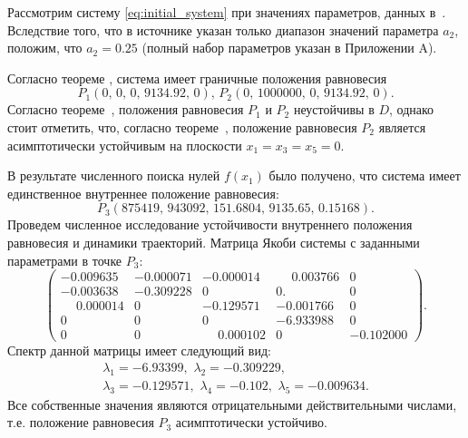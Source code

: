 \documentclass[14pt,a4paper]{extarticle}
\begin{document}
	\begin{example}
		Рассмотрим систему \ref{eq:initial_system} при значениях параметров, данных в~\cite{model_params}. Вследствие того, что в источнике указан только диапазон значений параметра $a_2$, положим, что $a_2=0.25$ (полный набор параметров указан в Приложении A). 
		
		Согласно теореме , система имеет граничные положения равновесия
		\[P_1\left(0,\,0,\,0,\,9134.92,\,0\right),\, P_2\left(0,\,1000000,\,0,\,9134.92,\,0\right).\]
		Согласно теореме~, положения равновесия $P_1$ и $P_2$ неустойчивы в $D$, однако стоит отметить, что, согласно теореме~, положение равновесия $P_2$ является асимптотически устойчивым на плоскости $x_1=x_3=x_5=0$. 
		
		В результате численного поиска нулей $f(x_1)$ было получено, что система имеет единственное внутреннее положение равновесия:
		\[P_3\left(875419,\,943092,\,151.6804,\,9135.65,\,0.15168\right).\]
		Проведем численное исследование устойчивости внутреннего положения равновесия и динамики траекторий. Матрица Якоби системы с заданными параметрами в точке $P_3$: 
		\[\begin{pmatrix}
			-0.009635&-0.000071&-0.000014& \phantom{-}0.003766&0\\
			-0.003638&-0.309228& 0       & 0.      & 0\\
			\phantom{-}0.000014& 0   &    -0.129571&-0.001766& 0\\
			0       & 0     &   0     &  -6.933988& 0\\
			0       & 0&\phantom{-}0.000102& 0   &   -0.102000 
		\end{pmatrix}.\]
		Спектр данной матрицы имеет следующий вид:
		\begin{multline*}
			\lambda_1=-6.93399,\,\, \lambda_2=-0.309229,\\
			\lambda_3=-0.129571,\,\, \lambda_4=-0.102,\,\, \lambda_5=-0.009634.
		\end{multline*}
		Все собственные значения являются отрицательными действительными числами, т.е. положение равновесия $P_3$ асимптотически устойчиво.
		

\end{example}
\end{document}
